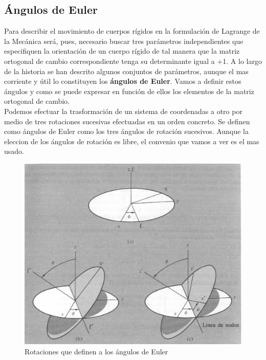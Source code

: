 \documentclass[12pt,a4paper]{book}
\begin{document}
\subsection{Ángulos de Euler}

Para describir el movimiento de cuerpos rígidos en la formulación de Lagrange de la
Mecánica será, pues, necesario buscar tres parámetros independientes que especifiquen la orientación de un cuerpo rígido de tal manera que la matriz ortogonal de cambio correspondiente tenga su determinante igual a +1. A lo largo de la historia se han descrito algunos conjuntos de parámetros, aunque el mas corriente y útil lo constituyen los \textbf{ángulos de Euler}. Vamos a definir estos ángulos y como se puede expresar en función de ellos los elementos de la matriz ortogonal de cambio. \\

Podemos efectuar la trasformación de un sistema de coordenadas a otro por medio de tres rotaciones sucesivas efectuadas en un orden concreto. Se definen como ángulos de Euler como los tres ángulos de rotación sucesivos. Aunque la eleccion de los ángulos de rotación es libre, el convenio que vamos a ver es el mas usado.

\begin{figure}[h!] \centering
\includegraphics[scale=0.6]{anguloseuler.png}
\caption{Rotaciones que definen a los ángulos de Euler}
\end{figure}
\end{document}
